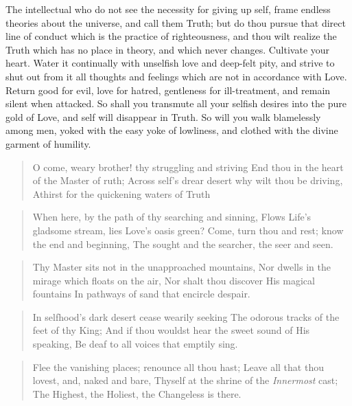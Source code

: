 \documentclass[12pt,oneside]{scrbook}
\begin{document}
  The intellectual who do not see the necessity for giving up self, frame
  endless theories about the universe, and call them Truth; but do thou
  pursue that direct line of conduct which is the practice of
  righteousness, and thou wilt realize the Truth which has no place in
  theory, and which never changes. Cultivate your heart. Water it
  continually with unselfish love and deep-felt pity, and strive to shut
  out from it all thoughts and feelings which are not in accordance with
  Love. Return good for evil, love for hatred, gentleness for
  ill-treatment, and remain silent when attacked. So shall you transmute
  all your selfish desires into the pure gold of Love, and self will
  disappear in Truth. So will you walk blamelessly among men, yoked with
  the easy yoke of lowliness, and clothed with the divine garment of
  humility.
  
  \begin{quote}
  O come, weary brother! thy struggling and striving End thou in the heart
  of the Master of ruth; Across self's drear desert why wilt thou be
  driving, Athirst for the quickening waters of Truth
  \end{quote}
  
  \begin{quote}
  When here, by the path of thy searching and sinning, Flows Life's
  gladsome stream, lies Love's oasis green? Come, turn thou and rest; know
  the end and beginning, The sought and the searcher, the seer and seen.
  \end{quote}
  
  \begin{quote}
  Thy Master sits not in the unapproached mountains, Nor dwells in the
  mirage which floats on the air, Nor shalt thou discover His magical
  fountains In pathways of sand that encircle despair.
  \end{quote}
  
  \begin{quote}
  In selfhood's dark desert cease wearily seeking The odorous tracks of
  the feet of thy King; And if thou wouldst hear the sweet sound of His
  speaking, Be deaf to all voices that emptily sing.
  \end{quote}
  
  \begin{quote}
  Flee the vanishing places; renounce all thou hast; Leave all that thou
  lovest, and, naked and bare, Thyself at the shrine of the
  \emph{Innermost} cast; The Highest, the Holiest, the Changeless is
  there.
  \end{quote}
  
\end{document}
